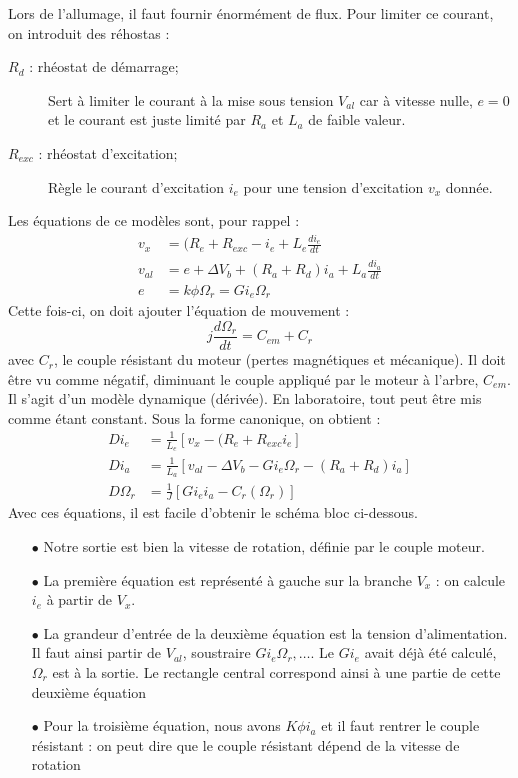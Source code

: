 	Lors de l'allumage, il faut fournir énormément de flux. Pour limiter ce courant, on 
	introduit des réhostas :
	\begin{description}
	\item[$R_d$ : rhéostat de démarrage;]  Sert à limiter le courant à la mise sous tension 
	$V_{al}$ car à vitesse nulle, $e=0$ et le courant est juste limité par $R_a$ et $L_a$ 
	de faible valeur.
	\item[$R_{exc}$ : rhéostat d'excitation;] Règle le courant d'excitation $i_e$ pour une 
	tension d'excitation $v_x$ donnée.
	\end{description}
	Les équations de ce modèles sont, pour rappel :
	\begin{equation}
	\begin{array}{ll}
	v_x &= (R_e+R_{exc}-i_e + L_e\frac{di_e}{dt}\\
	v_{al} &= e+\Delta V_b + (R_a+R_d)i_a + L_a\frac{di_a}{dt}\\
	e &= k\phi\Omega_r = Gi_e\Omega_r
	\end{array}
	\end{equation}
	Cette fois-ci, on doit ajouter l'équation de mouvement :
	\begin{equation}
	j\dfrac{d\Omega_r}{dt} = C_{em}+C_r
	\end{equation}
	avec $C_r$, le couple résistant du moteur (pertes magnétiques et mécanique). 
	Il doit être vu comme négatif, diminuant le couple appliqué par le moteur à l'arbre, 
	$C_{em}$.\\
	Il s'agit d'un modèle dynamique (dérivée). En laboratoire, tout peut être mis comme 
	étant constant. Sous la forme canonique, on obtient :
	\begin{equation}
	\begin{array}{ll}
	Di_e &= \frac{1}{L_e}[v_x-(R_e+R_{exc}i_e]\\
	Di_a &= \frac{1}{L_a}[v_{al} - \Delta V_b - Gi_e\Omega_r - (R_a+R_d)i_a]\\
	D\Omega_r &= \frac{1}{J}[Gi_ei_a - C_r(\Omega_r)]
	\end{array}
	\end{equation}
	Avec ces équations, il est facile d'obtenir le schéma bloc ci-dessous.  
	\begin{itemize}
	\item[$\bullet$] Notre sortie est bien la vitesse de rotation, définie par le couple 
	moteur.
	\item[$\bullet$] La première équation est représenté à gauche sur la branche $V_x$ : 
	on calcule $i_e$ à partir de $V_x$.
	\item[$\bullet$] La grandeur d'entrée de la deuxième équation est la tension d'alimentation. 
	Il faut ainsi partir de $V_{al}$, soustraire $Gi_e\Omega_r,\dots$. Le $Gi_e$ avait déjà été 
	calculé, $\Omega_r$ est à la sortie. Le rectangle central correspond ainsi à une partie de 
	cette deuxième équation
	\item[$\bullet$] Pour la troisième équation, nous avons $K\phi i_a$ et il faut rentrer 
	le couple résistant : on peut dire que le couple résistant dépend de la vitesse de 
	rotation
	\end{itemize}
	
